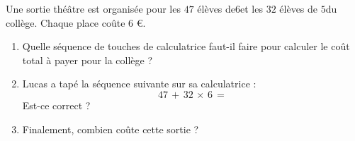 
\begin{exercice}\label{exosmath-0735}

Une sortie théâtre est organisée pour les $47$ élèves de\( 6\)\ieme et les $32$ élèves de \( 5\)\ieme du collège. Chaque place coûte 6 €.

\begin{enumerate}
    \item
        Quelle séquence de touches de calculatrice faut-il faire pour calculer le coût total à payer pour la collège ?
    \item
        Lucas a tapé la séquence suivante sur sa calculatrice :
\begin{equation}
    \boxed{47}\,\boxed{+}\,\boxed{32}\,\boxed{\times}\,\boxed{6}\,\boxed{=}
\end{equation}
        Est-ce correct ?
    \item
        Finalement, combien coûte cette sortie ?
\end{enumerate}

\end{exercice}
